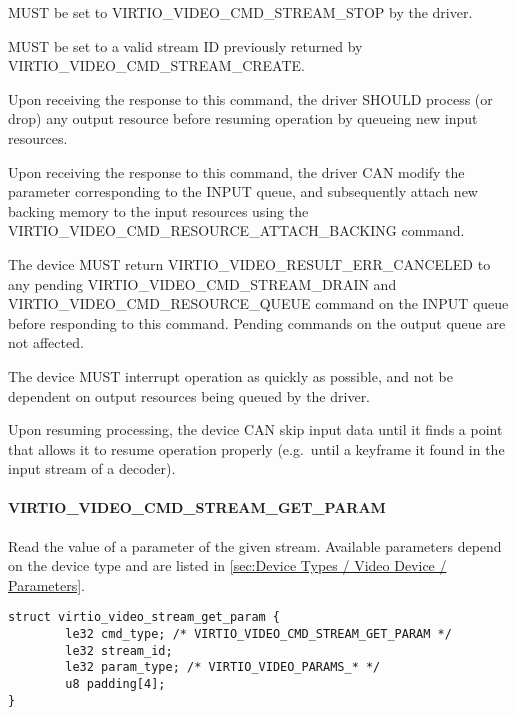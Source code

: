 
 MUST be set to VIRTIO\_VIDEO\_CMD\_STREAM\_STOP by the
driver.

 MUST be set to a valid stream ID previously returned
by VIRTIO\_VIDEO\_CMD\_STREAM\_CREATE.

Upon receiving the response to this command, the driver SHOULD process
(or drop) any output resource before resuming operation by queueing new
input resources.

Upon receiving the response to this command, the driver CAN modify the
 parameter corresponding to
the INPUT queue, and subsequently attach new backing memory to the input
resources using the VIRTIO\_VIDEO\_CMD\_RESOURCE\_ATTACH\_BACKING
command.


The device MUST return VIRTIO\_VIDEO\_RESULT\_ERR\_CANCELED to any
pending VIRTIO\_VIDEO\_CMD\_STREAM\_DRAIN and
VIRTIO\_VIDEO\_CMD\_RESOURCE\_QUEUE command on the INPUT queue before
responding to this command. Pending commands on the output queue are not
affected.

The device MUST interrupt operation as quickly as possible, and not be
dependent on output resources being queued by the driver.

Upon resuming processing, the device CAN skip input data until it finds
a point that allows it to resume operation properly (e.g.~until a
keyframe it found in the input stream of a decoder).

\paragraph{VIRTIO_VIDEO_CMD_STREAM_GET_PARAM}\label{sec:Device Types / Video Device / Device Operation / Device Operation: Stream commands / VIRTIO_VIDEO_CMD_STREAM_GET_PARAM}

Read the value of a parameter of the given stream. Available parameters
depend on the device type and are listed in
\ref{sec:Device Types / Video Device / Parameters}.

\begin{lstlisting}
struct virtio_video_stream_get_param {
        le32 cmd_type; /* VIRTIO_VIDEO_CMD_STREAM_GET_PARAM */
        le32 stream_id;
        le32 param_type; /* VIRTIO_VIDEO_PARAMS_* */
        u8 padding[4];
}
\end{lstlisting}


